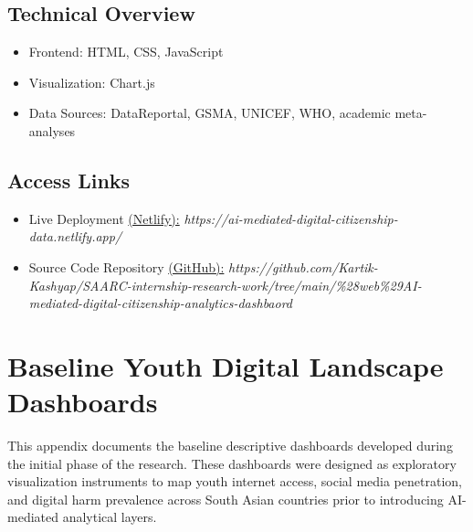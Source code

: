 \documentclass[12pt,a4paper]{report}
\begin{document}
\section{Technical Overview}
\begin{itemize}
  \item Frontend: HTML, CSS, JavaScript
  \item Visualization: Chart.js
  \item Data Sources: DataReportal, GSMA, UNICEF, WHO, academic meta-analyses
\end{itemize}

\section{Access Links}
\begin{itemize}
  \item Live Deployment \href{https://ai-mediated-digital-citizenship-data.netlify.app/}{(Netlify):} \textit{https://ai-mediated-digital-citizenship-data.netlify.app/}
  \item Source Code Repository \href{https://github.com/Kartik-Kashyap/SAARC-internship-research-work/tree/main/\%28web\%29AI-mediated-digital-citizenship-analytics-dashbaord}{(GitHub):} \textit{https://github.com/Kartik-Kashyap/SAARC-internship-research-work/tree/main/\%28web\%29AI-mediated-digital-citizenship-analytics-dashbaord}
\end{itemize}





\chapter{Baseline Youth Digital Landscape Dashboards}
\label{app:baseline_dashboard}

This appendix documents the baseline descriptive dashboards developed during the initial phase of the research. These dashboards were designed as exploratory visualization instruments to map youth internet access, social media penetration, and digital harm prevalence across South Asian countries prior to introducing AI-mediated analytical layers.
\end{document}
